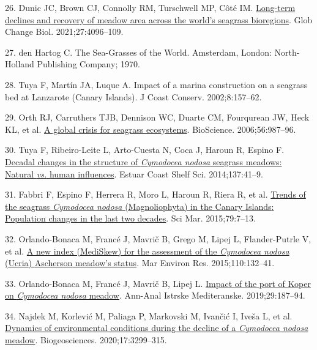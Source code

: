 \documentclass[
  12 pt,
]{article}
\newlength{\cslhangindent}
\newlength{\cslentryspacingunit} %
\newenvironment{CSLReferences}[2] %
 {%
  \setlength{\parindent}{0pt}
  \ifodd #1
  \let\oldpar\par
  \def\par{\hangindent=\cslhangindent\oldpar}
  \fi
  \setlength{\parskip}{#2\cslentryspacingunit}
 }%
 {}
\begin{document}
\begin{CSLReferences}{0}{0}
\leavevmode{}%
26. Dunic JC, Brown CJ, Connolly RM, Turschwell MP, Côté IM. \href{https://doi.org/10.1111/gcb.15684}{Long-term declines and recovery of meadow area across the world's seagrass bioregions}. Glob Change Biol. 2021;27:4096--109.

\leavevmode{}%
27. den Hartog C. The {Sea-Grasses} of the {World}. Amsterdam, London: North-Holland Publishing Company; 1970.

\leavevmode{}%
28. Tuya F, Martín JA, Luque A. Impact of a marina construction on a seagrass bed at {Lanzarote} ({Canary Islands}). J Coast Conserv. 2002;8:157--62.

\leavevmode{}%
29. Orth RJ, Carruthers TJB, Dennison WC, Duarte CM, Fourqurean JW, Heck KL, et al. \href{https://doi.org/10.1641/0006-3568(2006)56\%5B987:AGCFSE\%5D2.0.CO;2}{A global crisis for seagrass ecosystems}. BioScience. 2006;56:987--96.

\leavevmode{}%
30. Tuya F, Ribeiro-Leite L, Arto-Cuesta N, Coca J, Haroun R, Espino F. \href{https://doi.org/10.1016/j.ecss.2013.11.026}{Decadal changes in the structure of {{\emph{Cymodocea nodosa}}} seagrass meadows: {Natural} {{\emph{vs.}}} {human} influences}. Estuar Coast Shelf Sci. 2014;137:41--9.

\leavevmode{}%
31. Fabbri F, Espino F, Herrera R, Moro L, Haroun R, Riera R, et al. \href{https://doi.org/10.3989/scimar.04165.19B}{Trends of the seagrass {{\emph{Cymodocea nodosa}}} ({Magnoliophyta}) in the {Canary Islands}: Population changes in the last two decades}. Sci Mar. 2015;79:7--13.

\leavevmode{}%
32. Orlando-Bonaca M, Francé J, Mavrič B, Grego M, Lipej L, Flander-Putrle V, et al. \href{https://doi.org/10.1016/j.marenvres.2015.08.009}{A new index ({MediSkew}) for the assessment of the {{\emph{Cymodocea nodosa}}} ({Ucria}) {Ascherson} meadow's status}. Mar Environ Res. 2015;110:132--41.

\leavevmode{}%
33. Orlando-Bonaca M, Francé J, Mavrič B, Lipej L. \href{https://doi.org/10.19233/ASHN.2019.18}{Impact of the port of {Koper} on {{\emph{Cymodocea nodosa}}} meadow}. Ann-Anal Istrske Mediteranske. 2019;29:187--94.

\leavevmode{}%
34. Najdek M, Korlević M, Paliaga P, Markovski M, Ivančić I, Iveša L, et al. \href{https://doi.org/10.5194/bg-17-3299-2020}{Dynamics of environmental conditions during the decline of a {{\emph{Cymodocea nodosa}}} meadow}. Biogeosciences. 2020;17:3299--315.


\end{CSLReferences}
\end{document}
